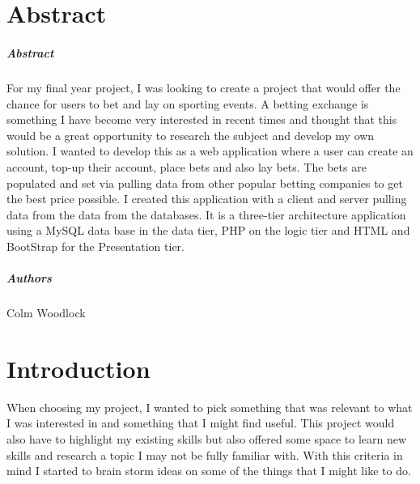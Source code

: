 
\chapter*{Abstract}
\paragraph{Abstract}
For my final year project, I was looking to create a project that would offer the chance for users to bet and lay on sporting events. A betting exchange is something I have become very interested in recent times and thought that this would be a great opportunity to research the subject and develop my own solution. I wanted to develop this as a web application where a user can create an account, top-up their account, place bets and also lay bets. The bets are populated and set via pulling data from other popular betting companies to get the best price possible. I created this application with a client and server pulling data from the data from the databases. It is a three-tier architecture application using a MySQL data base in the data tier, PHP on the logic tier and HTML and BootStrap for the Presentation tier.

\paragraph{Authors}
Colm Woodlock



\chapter{Introduction}
When choosing my project, I wanted to pick something that was relevant to what I was interested in and something that I might find useful. This project would also have to highlight my existing skills but also offered some space to learn new skills and research a topic I may not be fully familiar with. With this criteria in mind I started to brain storm ideas on some of the things that I might like to do. 


